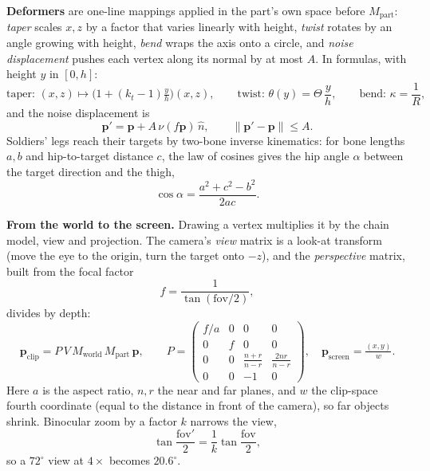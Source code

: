 \documentclass[12pt,a4paper,oneside]{report}
\begin{document}
\textbf{Deformers} are one-line mappings applied in the part's own space before $M_{\text{part}}$: \emph{taper} scales $x,z$ by a factor that varies linearly with height, \emph{twist} rotates by an angle growing with height, \emph{bend} wraps the axis onto a circle, and \emph{noise displacement} pushes each vertex along its normal by at most $A$. In formulas, with height $y$ in $[0,h]$:
\begin{equation}\text{taper: }(x,z)\!\mapsto\!\big(1+(k_t-1)\tfrac{y}{h}\big)(x,z),\qquad \text{twist: }\theta(y)=\Theta\,\frac{y}{h},\qquad \text{bend: }\kappa=\frac{1}{R},\end{equation}
and the noise displacement is
\begin{equation}\mathbf p'=\mathbf p+A\,\nu(f\mathbf p)\,\hat n,\qquad \lVert\mathbf p'-\mathbf p\rVert\le A.\end{equation}
Soldiers' legs reach their targets by two-bone inverse kinematics: for bone lengths $a,b$ and hip-to-target distance $c$, the law of cosines gives the hip angle $\alpha$ between the target direction and the thigh,
\begin{equation}\cos\alpha=\frac{a^{2}+c^{2}-b^{2}}{2ac}.\end{equation}

\textbf{From the world to the screen.} Drawing a vertex multiplies it by the chain model, view and projection. The camera's \emph{view} matrix is a look-at transform (move the eye to the origin, turn the target onto $-z$), and the \emph{perspective} matrix, built from the focal factor
\begin{equation}f=\frac{1}{\tan(\mathrm{fov}/2)},\end{equation}
divides by depth:
\begin{equation}\mathbf p_{\text{clip}}=P\,V\,M_{\text{world}}\,M_{\text{part}}\,\mathbf p,\qquad P=\begin{pmatrix}f/a&0&0&0\\0&f&0&0\\0&0&\tfrac{n+r}{n-r}&\tfrac{2nr}{n-r}\\0&0&-1&0\end{pmatrix},\quad \mathbf p_{\text{screen}}=\tfrac{(x,y)}{w}.\end{equation}
Here $a$ is the aspect ratio, $n,r$ the near and far planes, and $w$ the clip-space fourth coordinate (equal to the distance in front of the camera), so far objects shrink. Binocular zoom by a factor $k$ narrows the view,
\begin{equation}\tan\frac{\mathrm{fov}'}{2}=\frac{1}{k}\tan\frac{\mathrm{fov}}{2},\end{equation}
so a $72^{\circ}$ view at $4\times$ becomes $20.6^{\circ}$.
\end{document}
